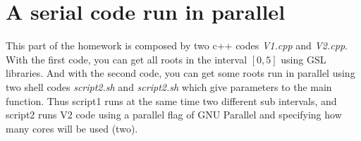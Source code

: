\documentclass[]{scrartcl}
\begin{document}
\section{A serial code run in parallel}
This part of the homework is composed by two c++ codes \textit{V1.cpp} and \textit{V2.cpp}. With the first code, you can get all roots in the interval $\left[0,5\right]$ using GSL libraries. And with the second code, you can get some roots run in parallel using two shell codes \textit{script2.sh} and \textit{script2.sh} which give parameters to the main function. Thus script1 runs at the same time two different sub intervals, and script2 runs V2 code using a parallel flag of GNU Parallel and specifying how many cores will be used (two).
\end{document}
